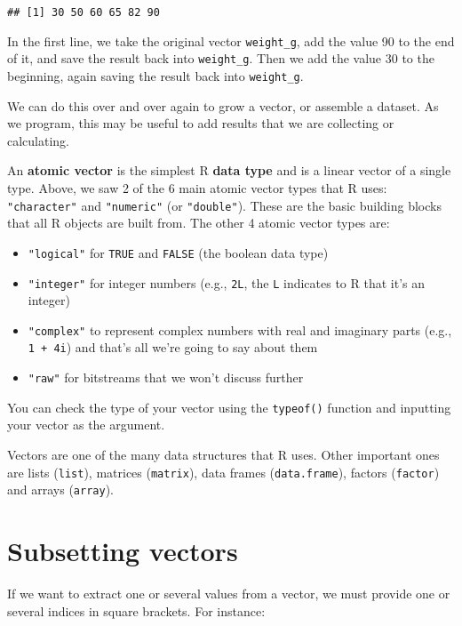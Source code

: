 \documentclass[]{book}
\providecommand{\tightlist}{%
  \setlength{\itemsep}{0pt}\setlength{\parskip}{0pt}}
\begin{document}
\begin{verbatim}
## [1] 30 50 60 65 82 90
\end{verbatim}

In the first line, we take the original vector \texttt{weight\_g}, add
the value 90 to the end of it, and save the result back into
\texttt{weight\_g}. Then we add the value 30 to the beginning, again
saving the result back into \texttt{weight\_g}.

We can do this over and over again to grow a vector, or assemble a
dataset. As we program, this may be useful to add results that we are
collecting or calculating.

An \textbf{atomic vector} is the simplest R \textbf{data type} and is a
linear vector of a single type. Above, we saw 2 of the 6 main atomic
vector types that R uses: \texttt{"character"} and \texttt{"numeric"}
(or \texttt{"double"}). These are the basic building blocks that all R
objects are built from. The other 4 atomic vector types are:

\begin{itemize}
\tightlist
\item
  \texttt{"logical"} for \texttt{TRUE} and \texttt{FALSE} (the boolean
  data type)
\item
  \texttt{"integer"} for integer numbers (e.g., \texttt{2L}, the
  \texttt{L} indicates to R that it's an integer)
\item
  \texttt{"complex"} to represent complex numbers with real and
  imaginary parts (e.g., \texttt{1\ +\ 4i}) and that's all we're going
  to say about them
\item
  \texttt{"raw"} for bitstreams that we won't discuss further
\end{itemize}

You can check the type of your vector using the \texttt{typeof()}
function and inputting your vector as the argument.

Vectors are one of the many data structures that R uses. Other important
ones are lists (\texttt{list}), matrices (\texttt{matrix}), data frames
(\texttt{data.frame}), factors (\texttt{factor}) and arrays
(\texttt{array}).

\section{Subsetting vectors}\label{subsetting-vectors}

If we want to extract one or several values from a vector, we must
provide one or several indices in square brackets. For instance:
\end{document}
